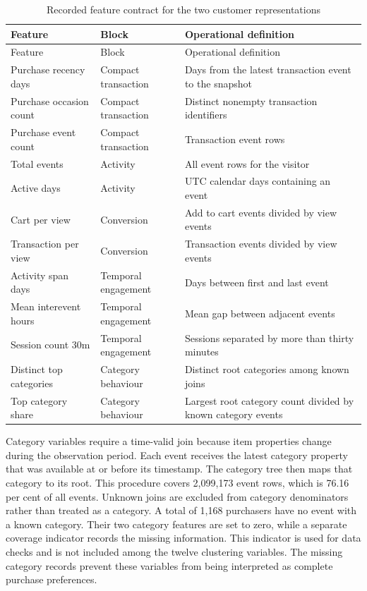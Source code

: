 \begin{longtable}{p{}p{}p{}}
\caption{Recorded feature contract for the two customer representations}\label{tab:feature_contract}\\
\toprule
Feature & Block & Operational definition \\
\midrule
\endfirsthead
\toprule
Feature & Block & Operational definition \\
\midrule
\endhead
Purchase recency days & Compact transaction & Days from the latest transaction event to the snapshot \\
Purchase occasion count & Compact transaction & Distinct nonempty transaction identifiers \\
Purchase event count & Compact transaction & Transaction event rows \\
Total events & Activity & All event rows for the visitor \\
Active days & Activity & UTC calendar days containing an event \\
Cart per view & Conversion & Add to cart events divided by view events \\
Transaction per view & Conversion & Transaction events divided by view events \\
Activity span days & Temporal engagement & Days between first and last event \\
Mean interevent hours & Temporal engagement & Mean gap between adjacent events \\
Session count 30m & Temporal engagement & Sessions separated by more than thirty minutes \\
Distinct top categories & Category behaviour & Distinct root categories among known joins \\
Top category share & Category behaviour & Largest root category count divided by known category events \\
\bottomrule
\end{longtable}

Category variables require a time-valid join because item properties change during the observation period. Each event receives the latest category property that was available at or before its timestamp. The category tree then maps that category to its root. This procedure covers 2,099,173 event rows, which is 76.16 per cent of all events. Unknown joins are excluded from category denominators rather than treated as a category. A total of 1,168 purchasers have no event with a known category. Their two category features are set to zero, while a separate coverage indicator records the missing information. This indicator is used for data checks and is not included among the twelve clustering variables. The missing category records prevent these variables from being interpreted as complete purchase preferences.

